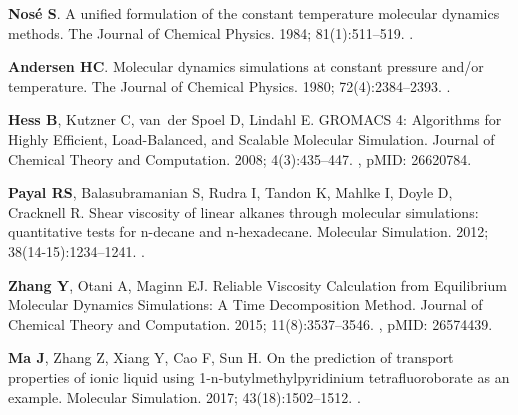 \documentclass[9pt,bestpractices]{livecoms}
\begin{document}
\begin{thebibliography}{61}
	\textbf{\color{LiveCoMSMediumGrey} Nos{\'e} S}.
	\newblock A unified formulation of the constant temperature molecular dynamics
	methods.
	\newblock The Journal of Chemical Physics.  1984; 81(1):511--519.
	\newblock \href{https://dx.doi.org/10.1063/1.447334}{\doiprefix
		}.
	
	\textbf{\color{LiveCoMSMediumGrey} Andersen HC}.
	\newblock Molecular dynamics simulations at constant pressure and/or
	temperature.
	\newblock The Journal of Chemical Physics.  1980; 72(4):2384--2393.
	\newblock \href{https://dx.doi.org/10.1063/1.439486}{\doiprefix
		}.
	
	\textbf{\color{LiveCoMSMediumGrey} Hess B}, Kutzner C, van~der Spoel D, Lindahl
	E.
	\newblock GROMACS 4{:} Algorithms for Highly Efficient, Load-Balanced, and
	Scalable Molecular Simulation.
	\newblock Journal of Chemical Theory and Computation.  2008; 4(3):435--447.
	\newblock \href{https://dx.doi.org/10.1021/ct700301q}{\doiprefix
		}, pMID: 26620784.
	
	\textbf{\color{LiveCoMSMediumGrey} Payal RS}, Balasubramanian S, Rudra I,
	Tandon K, Mahlke I, Doyle D, Cracknell R.
	\newblock Shear viscosity of linear alkanes through molecular simulations:
	quantitative tests for n-decane and n-hexadecane.
	\newblock Molecular Simulation.  2012; 38(14-15):1234--1241.
	\newblock \href{https://dx.doi.org/10.1080/08927022.2012.702423}{\doiprefix
		}.
	
	\textbf{\color{LiveCoMSMediumGrey} Zhang Y}, Otani A, Maginn EJ.
	\newblock Reliable Viscosity Calculation from Equilibrium Molecular Dynamics
	Simulations: A Time Decomposition Method.
	\newblock Journal of Chemical Theory and Computation.  2015; 11(8):3537--3546.
	\newblock \href{https://dx.doi.org/10.1021/acs.jctc.5b00351}{\doiprefix
		}, pMID: 26574439.
	
	\textbf{\color{LiveCoMSMediumGrey} Ma J}, Zhang Z, Xiang Y, Cao F, Sun H.
	\newblock On the prediction of transport properties of ionic liquid using
	1-n-butylmethylpyridinium tetrafluoroborate as an example.
	\newblock Molecular Simulation.  2017; 43(18):1502--1512.
	\newblock \href{https://dx.doi.org/10.1080/08927022.2017.1321760}{\doiprefix
		}.
	

\end{thebibliography}
\end{document}
